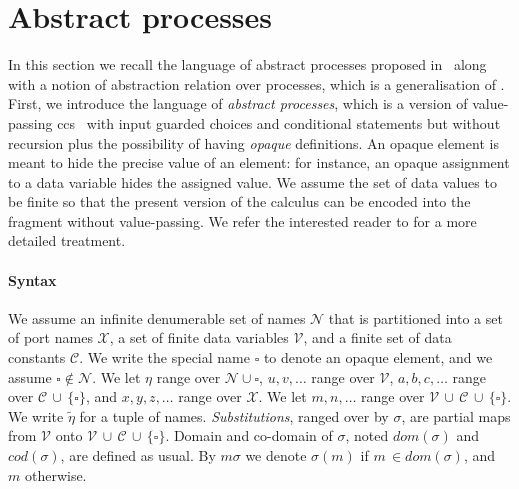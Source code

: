 \documentclass[submission,copyright,creativecommons]{eptcs}
\newcommand{\opaque}{\square}
\newcommand{\dom}{\mathit{dom}}
\newcommand{\cod}{\mathit{cod}}
\begin{document}
\section{Abstract processes}
\label{sec:concrete-processes}

In this section we recall the language of abstract processes proposed
in~\cite{BM:APOL} along with a notion of abstraction relation over processes, 
which is a generalisation of \cite{BD:SSPC}.
First, we introduce the language of {\em abstract processes}, 
which is a version of value-passing {\sc  ccs}~\cite{Mil:CC} with 
input guarded choices and conditional statements but without recursion 
plus the possibility of having {\em opaque} definitions.
An opaque element is meant to hide the precise value of an element: for 
instance, an opaque assignment to a data variable hides the assigned value. 
We assume the set of data values to be finite so that the present 
version of the calculus can be encoded into the fragment without 
value-passing. We refer the interested reader to \cite{Mil:CC} for a more 
detailed treatment. 

\paragraph{Syntax}
\label{sec:synt-inform-semant-concrete}
We assume an infinite denumerable set of names $\mathcal{N}$
that is partitioned into a set of port names $\mathcal{X}$,
a set of finite data variables $\mathcal{V}$,
and a finite set of data constants $\mathcal{C}$.
We write the special name $\opaque$ to denote an opaque element, and 
we assume $\opaque\not\in\mathcal{N}$. We let $\eta$ range over 
$\mathcal{N}\cup\opaque$, $u,v,\ldots$ range over $\mathcal{V}$, 
$a,b,c,\ldots$ range over $\mathcal{C} \, \cup \, \{\opaque\}$, and 
$x,y,z,\ldots$ range over $\mathcal{X}$. We let $m,n,\ldots$ 
range over $\mathcal{V} \,\cup\, \mathcal{C} \, \cup \, \{\opaque\}$. 
We write $\tilde{\eta}$ for a tuple of names. {\em Substitutions}, 
ranged over by $\sigma$, are partial maps from 
$\mathcal{V}$ onto $\mathcal{V} \,\cup\, \mathcal{C} \, \cup \, \{\opaque\}$. 
Domain and co-domain of $\sigma$, noted $\dom(\sigma)$ and $\cod(\sigma)$, are 
defined as usual.  By $m \sigma$ we denote $\sigma(m)$ if $m \, \in 
\dom(\sigma)$, and $m$ otherwise. 
\end{document}
